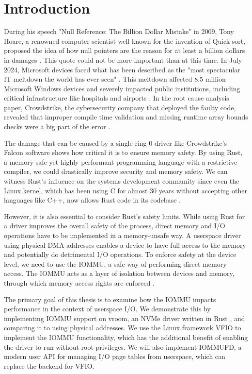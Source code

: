\chapter{Introduction}\label{c:introduction}

During his speech "Null Reference: The Billion Dollar Mistake" in 2009, Tony Hoare, a renowned computer scientist well known for the invention of Quick-sort, proposed the idea of how null pointers are the reason for at least a billion dollars in damages \cite{billiondollarmistake}. This quote could not be more important than at this time. In July 2024, Microsoft devices faced what has been described as the "most spectacular IT meltdown the world has ever seen" \cite{bloombergmeltdown}. This meltdown affected 8.5 million Microsoft Windows devices and severely impacted public institutions, including critical infrastructure like hospitals and airports \cite{bloomberg8milliondevices}. In the root cause analysis paper, Crowdstrike, the cybersecurity company that deployed the faulty code, revealed that improper compile time validation and missing runtime array bounds checks were a big part of the error \cite{crowdstrikerca}.

The damage that can be caused by a single ring 0 driver like Crowdstrike's Falcon software shows how critical it is to ensure memory safety. By using Rust, a memory-safe yet highly performant programming language with a restrictive compiler, we could drastically improve security and memory safety. We can witness Rust's influence on the systems development community since even the Linux kernel, which has been using C for almost 30 years without accepting other languages like C++, now allows Rust code in its codebase \cite{linuxrustpull}.

However, it is also essential to consider Rust's safety limits. While using Rust for a driver improves the overall safety of the process, direct memory and I/O operations have to be implemented in a memory-unsafe way. A userspace driver using physical DMA addresses enables a device to have full access to the memory and potentially do detrimental I/O operations.
To enforce safety at the device level, we need to use the IOMMU, a safe way of performing direct memory access. The IOMMU acts as a layer of isolation between devices and memory, through which memory access rights are enforced \cite{OLS2007}.

The primary goal of this thesis is to examine how the IOMMU impacts performance in the context of userspace I/O.
We demonstrate this by implementing IOMMU support on vroom, an NVMe driver written in Rust \cite{vroom}, and comparing it to using physical addresses. We use the Linux framework VFIO to implement the IOMMU functionality, which has the additional benefit of enabling the driver to run without root privileges. We will also implement IOMMUFD, a modern user API for managing I/O page tables from userspace, which can replace the backend for VFIO.